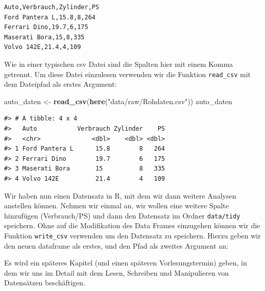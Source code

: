 \documentclass[]{tufte-book}
\newenvironment{Shaded}{}{}
\newcommand{\KeywordTok}[1]{\textcolor[rgb]{0.00,0.44,0.13}{\textbf{#1}}}
\newcommand{\DataTypeTok}[1]{\textcolor[rgb]{0.56,0.13,0.00}{#1}}
\newcommand{\StringTok}[1]{\textcolor[rgb]{0.25,0.44,0.63}{#1}}
\newcommand{\OperatorTok}[1]{\textcolor[rgb]{0.40,0.40,0.40}{#1}}
\newcommand{\NormalTok}[1]{#1}
\begin{document}
\begin{verbatim}
Auto,Verbrauch,Zylinder,PS
Ford Pantera L,15.8,8,264
Ferrari Dino,19.7,6,175
Maserati Bora,15,8,335
Volvo 142E,21.4,4,109
\end{verbatim}

Wie in einer typischen csv Datei sind die Spalten hier mit einem Komma
getrennt. Um diese Datei einzulesen verwenden wir die Funktion
\texttt{read\_csv} mit dem Dateipfad als erstes Argument:

\begin{Shaded}
\begin{Highlighting}[]
\NormalTok{auto_daten <-}\StringTok{ }\KeywordTok{read_csv}\NormalTok{(}\KeywordTok{here}\NormalTok{(}\StringTok{"data/raw/Rohdaten.csv"}\NormalTok{))}
\NormalTok{auto_daten}
\end{Highlighting}
\end{Shaded}

\begin{verbatim}
#> # A tibble: 4 x 4
#>   Auto           Verbrauch Zylinder    PS
#>   <chr>              <dbl>    <dbl> <dbl>
#> 1 Ford Pantera L      15.8        8   264
#> 2 Ferrari Dino        19.7        6   175
#> 3 Maserati Bora       15          8   335
#> 4 Volvo 142E          21.4        4   109
\end{verbatim}

Wir haben nun einen Datensatz in R, mit dem wir dann weitere Analysen
anstellen können. Nehmen wir einmal an, wir wollen eine weitere Spalte
hinzufügen (Verbrauch/PS) und dann den Datensatz im Ordner
\texttt{data/tidy} speichern. Ohne auf die Modifikation des Data Frames
einzugehen können wir die Funktion \texttt{write\_csv} verwenden um den
Datensatz zu speichern. Hierzu geben wir den neuen dataframe als erstes,
und den Pfad als zweites Argument an:

\begin{Shaded}
\end{Shaded}

Es wird ein späteres Kapitel (und einen späteren Vorlesungstermin)
geben, in dem wir uns im Detail mit dem Lesen, Schreiben und
Manipulieren von Datensätzen beschäftigen.
\end{document}
